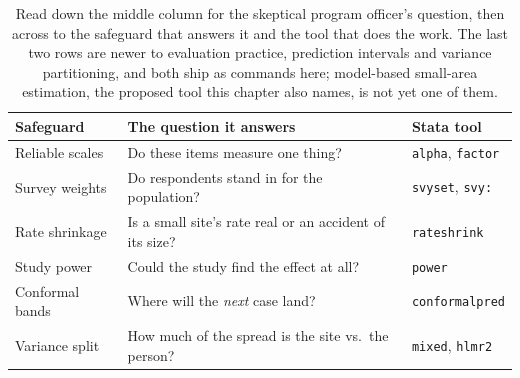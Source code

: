 \documentclass[
    a4paper,
    fontsize=10pt,
    twoside=true,
    numbers=noenddot,
]{kaobook}
\begin{document}
\begin{table}[htbp]
\centering
\caption[The chapter's safeguards and the question each answers]{Read down the middle column for the skeptical program officer's question, then across to the safeguard that answers it and the tool that does the work. The last two rows are newer to evaluation practice, prediction intervals and variance partitioning, and both ship as commands here; model-based small-area estimation, the proposed tool this chapter also names, is not yet one of them.}
\label{tab:ch07-viz-map}
{\footnotesize
\begin{tabular}{p{2.3cm}p{4.7cm}p{2.4cm}}
\hline
Safeguard & The question it answers & Stata tool \\
\hline
Reliable scales & Do these items measure one thing? & \texttt{alpha}, \texttt{factor} \\
Survey weights & Do respondents stand in for the population? & \texttt{svyset}, \texttt{svy:} \\
Rate shrinkage & Is a small site's rate real or an accident of its size? & \texttt{rateshrink} \\
Study power & Could the study find the effect at all? & \texttt{power} \\
Conformal bands & Where will the \emph{next} case land? & \texttt{conformalpred} \\
Variance split & How much of the spread is the site vs.\ the person? & \texttt{mixed}, \texttt{hlmr2} \\
\hline
\end{tabular}
}
\end{table}
\end{document}
